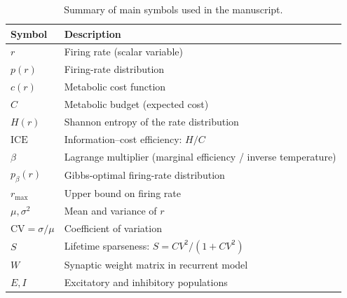\documentclass[11pt]{article}
\theoremstyle{remark}
\theoremstyle{definition}
\begin{document}
\begin{table}[h!]
\centering
\caption{Summary of main symbols used in the manuscript.}
\begin{tabular}{ll}
\hline
\textbf{Symbol} & \textbf{Description} \\
\hline
$r$ & Firing rate (scalar variable) \\
$p(r)$ & Firing-rate distribution \\
$c(r)$ & Metabolic cost function \\
$C$ & Metabolic budget (expected cost) \\
$H(r)$ & Shannon entropy of the rate distribution \\
$\mathrm{ICE}$ & Information--cost efficiency: $H/C$ \\
$\beta$ & Lagrange multiplier (marginal efficiency / inverse temperature) \\
$p_\beta(r)$ & Gibbs-optimal firing-rate distribution \\
$r_{\max}$ & Upper bound on firing rate \\
$\mu,\sigma^2$ & Mean and variance of $r$ \\
$\mathrm{CV}=\sigma/\mu$ & Coefficient of variation \\
$S$ & Lifetime sparseness: $S = CV^2 / (1 + CV^2)$ \\
$W$ & Synaptic weight matrix in recurrent model \\
$E,I$ & Excitatory and inhibitory populations \\
\hline
\end{tabular}
\label{table:symbols}
\end{table}
\end{document}
